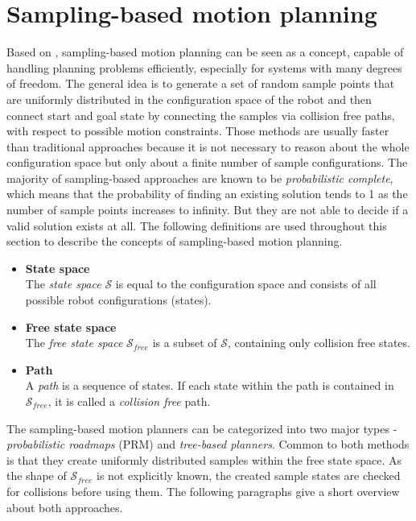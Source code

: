 \section{Sampling-based motion planning}

Based on \citep[chapter 2]{omplPrimer}, sampling-based motion planning can be seen as a concept, capable of handling planning problems efficiently, especially for systems with many degrees of freedom. The general idea is to generate a set of random sample points that are uniformly distributed in the configuration space of the robot and then connect start and goal state by connecting the samples via collision free paths, with respect to possible motion constraints. Those methods are usually faster than traditional approaches because it is not necessary to reason about the whole configuration space but only about a finite number of sample configurations. The majority of sampling-based approaches are known to be \emph{probabilistic complete}, which means that the probability of finding an existing solution tends to 1 as the number of sample points increases to infinity. But they are not able to decide if a valid solution exists at all. The following definitions are used throughout this section to describe the concepts of sampling-based motion planning.

\begin{itemize}

\item \textbf{State space} \\
The \emph{state space} $\mathcal{S}$ is equal to the configuration space and consists of all possible robot configurations (states).

\item \textbf{Free state space} \\
The \emph{free state space} $\mathcal{S}_{free}$ is a subset of $\mathcal{S}$, containing only collision free states.  

\item \textbf{Path} \\
A \emph{path} is a sequence of states. If each state within the path is contained in $\mathcal{S}_{free}$, it is called a \emph{collision free} path.  

\end{itemize}

The sampling-based motion planners can be categorized into two major types - \emph{probabilistic roadmaps} (PRM) and \emph{tree-based planners}. Common to both methods is that they create uniformly distributed samples within the free state space. As the shape of $\mathcal{S}_{free}$ is not explicitly known, the created sample states are checked for collisions before using them. The following paragraphs give a short overview about both approaches.

